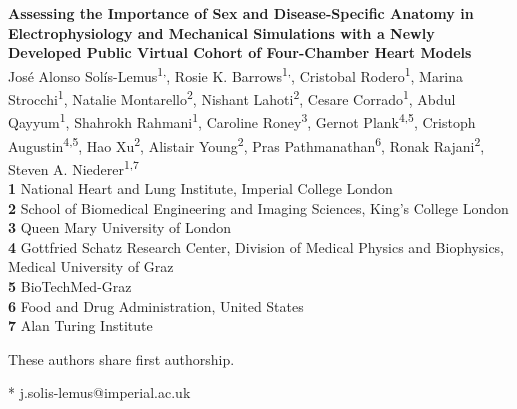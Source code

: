 \documentclass[10pt,letterpaper]{article}
\newcommand{\autor}{ Jos\'e Alonso Sol\'is-Lemus\textsuperscript{1,\Yinyang}, 
        Rosie K. Barrows\textsuperscript{1,\Yinyang},  
        Cristobal Rodero\textsuperscript{1}, 
        Marina Strocchi\textsuperscript{1}, 
        Natalie Montarello\textsuperscript{2}, Nishant Lahoti\textsuperscript{2}, 
        Cesare Corrado\textsuperscript{1}, 
        Abdul Qayyum\textsuperscript{1}, 
        Shahrokh Rahmani\textsuperscript{1},  
        Caroline Roney\textsuperscript{3}, 
        Gernot Plank\textsuperscript{4,5},
        Cristoph Augustin\textsuperscript{4,5}, 
        Hao Xu\textsuperscript{2}, 
        Alistair Young\textsuperscript{2}, 
        Pras Pathmanathan\textsuperscript{6}, 
        Ronak Rajani\textsuperscript{2},
        Steven A. Niederer\textsuperscript{1,7}
}
\newcommand{\titulo}{
    Assessing the Importance of Sex and Disease-Specific Anatomy in 
    Electrophysiology and Mechanical Simulations with a Newly Developed 
    Public Virtual Cohort of Four-Chamber Heart Models
    }
\begin{document}
\vspace*{0.2in}

\begin{flushleft}
{\Large
\textbf{\titulo} %
}
\newline
\\
\autor\ 
\\
\bigskip
\textbf{1} National Heart and Lung Institute, Imperial College London 
\\
\textbf{2} School of Biomedical Engineering and Imaging Sciences, King's College London
\\
\textbf{3} Queen Mary University of London
\\
\textbf{4} Gottfried Schatz Research Center, Division of Medical Physics and Biophysics, Medical University of Graz
\\ 
\textbf{5} BioTechMed-Graz 
\\
\textbf{6} Food and Drug Administration, United States
\\
\textbf{7} Alan Turing Institute
\\ 
\bigskip

% 
%
\Yinyang These authors share first authorship.





* j.solis-lemus@imperial.ac.uk

\end{flushleft}
\end{document}
